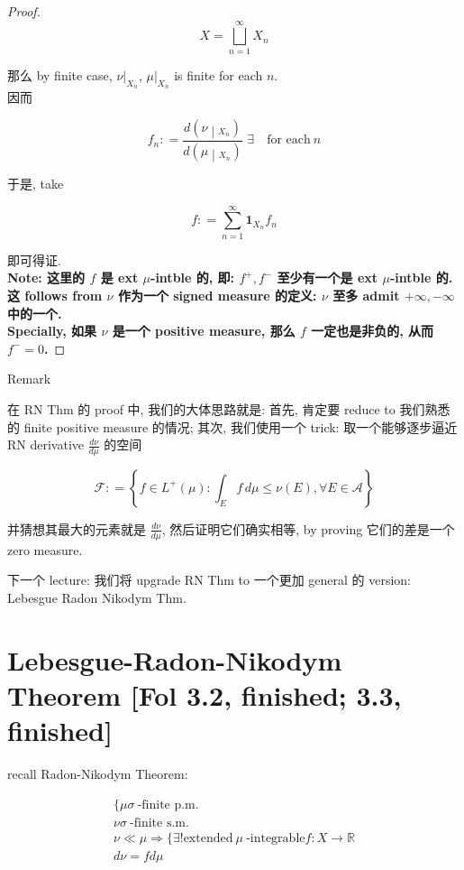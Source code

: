 \documentclass{qlnotes-export}
\begin{document}
\begin{proof}
\[X = \bigsqcup\limits_{n = 1}^{\infty}X_{n}\]

那么 by finite case, \(\nu|_{X_{n}}\), \(\mu|_{X_{n}}\) is finite for each \(n\).\\
因而

\[f_{n}: = \frac{\left. d(\nu \middle| {}_{X_{n}}) \right.}{\left. d(\mu \middle| {}_{X_{n}}) \right.}\,\,\exists\quad\text{for each}\ n\]

于是, take

\[f: = \sum\limits_{n = 1}^{\infty}\mathbf{1}_{X_{n}}f_{n}\]

即可得证.\\
\textbf{Note: 这里的 \(f\) 是 ext \(\mu\)-intble 的, 即: \(f^{+},f^{-}\) 至少有一个是 ext \(\mu\)-intble 的. 这 follows from \(\nu\) 作为一个 signed measure 的定义: \(\nu\) 至多 admit \(+ \infty, - \infty\) 中的一个.\\
Specially, 如果 \(\nu\) 是一个 positive measure, 那么 \(f\) 一定也是非负的, 从而 \(f^{-} = 0\).}

\end{proof}

\begin{qlremark}{Remark}

在 RN Thm 的 proof 中, 我们的大体思路就是: 首先, 肯定要 reduce to 我们熟悉的 finite positive measure 的情况; 其次, 我们使用一个 trick: 取一个能够逐步逼近 RN derivative \(\frac{d\nu}{d\mu}\) 的空间

\[\mathcal{F}: = \left\{ {f \in L^{+}(\mu):\int_{E}f\, d\mu \leq \nu(E),\forall E \in \mathcal{A}} \right\}\]

并猜想其最大的元素就是 \(\frac{d\nu}{d\mu}\), 然后证明它们确实相等, by proving 它们的差是一个 zero measure.

\end{qlremark}

下一个 lecture: 我们将 upgrade RN Thm to 一个更加 general 的 version: Lebesgue Radon Nikodym Thm.

\section{Lebesgue-Radon-Nikodym Theorem {[}Fol 3.2, finished; 3.3, finished{]}}

recall Radon-Nikodym Theorem:

\[\begin{matrix}
{\{\mu\sigma\ \text{-finite p.m.}} \\
{\nu\sigma\ \text{-finite s.m.}} \\
{\nu \ll \mu\Longrightarrow\{\exists!\text{extended}\ \mu\ \text{-integrable} f:X\rightarrow{\mathbb{R}}} \\
{d\nu = fd\mu}
\end{matrix}\]
\end{document}
